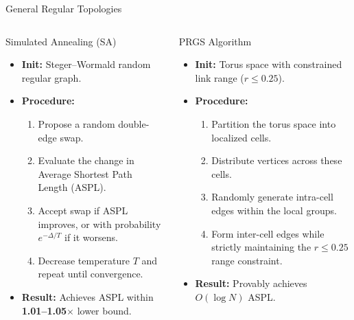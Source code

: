\documentclass[aspectratio=169]{beamer}
\begin{document}
\begin{frame}{General Regular Topologies}
  \vspace{0.1cm}
  \begin{columns}[T, totalwidth=\textwidth]

    \begin{block}{Simulated Annealing (SA)}
      \small
      \begin{itemize}
        \setlength\itemsep{0.3em}
        \item \textbf{Init:} Steger--Wormald random regular graph.
        \item \textbf{Procedure:}
        \begin{enumerate}
            \item Propose a random double-edge swap.
            \item Evaluate the change in Average Shortest Path Length (ASPL).
            \item Accept swap if ASPL improves, or with probability $e^{-\Delta/T}$ if it worsens.
            \item Decrease temperature $T$ and repeat until convergence.
        \end{enumerate}
        \item \textbf{Result:} Achieves ASPL within \textbf{1.01--1.05$\times$} lower bound.
      \end{itemize}
    \end{block}

    \begin{block}{PRGS Algorithm}
      \small
      \begin{itemize}
        \setlength\itemsep{0.3em}
        \item \textbf{Init:} Torus space with constrained link range ($r \leq 0.25$).
        \item \textbf{Procedure:}
        \begin{enumerate}
            \item Partition the torus space into localized cells.
            \item Distribute vertices across these cells.
            \item Randomly generate intra-cell edges within the local groups.
            \item Form inter-cell edges while strictly maintaining the $r \leq 0.25$ range constraint.
        \end{enumerate}
        \item \textbf{Result:} Provably achieves $O(\log N)$ ASPL.
      \end{itemize}
    \end{block}

  \end{columns}
\end{frame}
\end{document}
